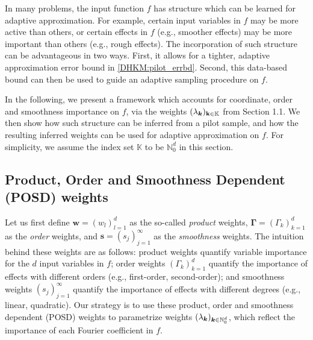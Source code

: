 \documentclass[USenglish]{article}
\theoremstyle{dgthm}
\theoremstyle{dgthm}
\theoremstyle{dgthm}
\theoremstyle{dgthm}
\theoremstyle{dgdef}
\theoremstyle{definition}
\begin{document}
In many problems, the input function $f$ has structure which can be learned for adaptive approximation. For example, certain input variables in $f$ may be more active than others, or certain effects in $f$ (e.g., smoother effects) may be more important than others (e.g., rough effects). The incorporation of such structure can be advantageous in two ways. First, it allows for a tighter, adaptive approximation error bound in \eqref{DHKM:pilot_errbd}. Second, this data-based bound can then be used to guide an adaptive sampling procedure on $f$.

In the following, we present a framework which accounts for coordinate, order and smoothness importance on $f$, via the weights $(\lambda_{\boldsymbol{k}})_{\mathbf{k} \in \mathbb{K}}$ from Section 1.1. We then show how such structure can be inferred from a pilot sample, and how the resulting inferred weights can be used for adaptive approximation on $f$. For simplicity, we assume the index set $\mathbb{K}$ to be $\mathbb{N}_0^d$ in this section.


\subsection{Product, Order and Smoothness Dependent (POSD) weights}
Let us first define $\mathbf{w} = (w_l)_{l=1}^d$ as the so-called \textit{product} weights, $\boldsymbol{\Gamma} = (\Gamma_k)_{k=1}^d$ as the \textit{order} weights, and $\mathbf{s} = (s_j)_{j=1}^\infty$ as the \textit{smoothness} weights. The intuition behind these weights are as follows: product weights quantify variable importance for the $d$ input variables in $f$; order weights $(\Gamma_k)_{k=1}^d$ quantify the importance of effects with different orders (e.g., first-order, second-order); and smoothness weights $(s_j)_{j=1}^\infty$ quantify the importance of effects with different degrees (e.g., linear, quadratic). Our strategy is to use these product, order and smoothness dependent (POSD) weights to parametrize weights $(\lambda_{{\boldsymbol{k}}})_{{\boldsymbol{k}} \in \mathbb{N}_0^d}$, which reflect the importance of each Fourier coefficient in $f$.
\end{document}
